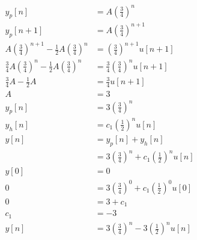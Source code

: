 \documentclass[10pt,a4paper, margin=1in]{article}
\begin{document}
\begin{enumerate}
\begin{enumerate}
\begin{align*}
        y_p[n] &= A\left(\frac{3}{4}\right)^n \\
        y_p[n + 1] &= A\left(\frac{3}{4}\right)^{n + 1} \\
        A\left(\frac{3}{4}\right)^{n + 1} - \frac{1}{2}A\left(\frac{3}{4}\right)^n &= \left(\frac{3}{4}\right)^{n + 1}u[n + 1] \\
        \frac{3}{4}A\left(\frac{3}{4}\right)^n - \frac{1}{2}A\left(\frac{3}{4}\right)^n &= \frac{3}{4}\left(\frac{3}{4}\right)^nu[n + 1] \\
        \frac{3}{4}A - \frac{1}{2}A &= \frac{3}{4}u[n + 1] \\
        A &= 3 \\
        y_p[n] &= 3\left(\frac{3}{4}\right)^n \\
        y_h[n] &= c_1\left(\frac{1}{2}\right)^nu[n] \\
        y[n] &= y_p[n] + y_h[n] \\
        &= 3\left(\frac{3}{4}\right)^n + c_1\left(\frac{1}{2}\right)^nu[n] \\
        y[0] &= 0 \\
        0 &= 3\left(\frac{3}{4}\right)^0 + c_1\left(\frac{1}{2}\right)^0u[0] \\
        0 &= 3 + c_1 \\
        c_1 &= -3 \\
        y[n] &= 3\left(\frac{3}{4}\right)^n - 3\left(\frac{1}{2}\right)^nu[n] \\
    \end{align*}
    \end{enumerate}


\end{enumerate}
\end{document}
